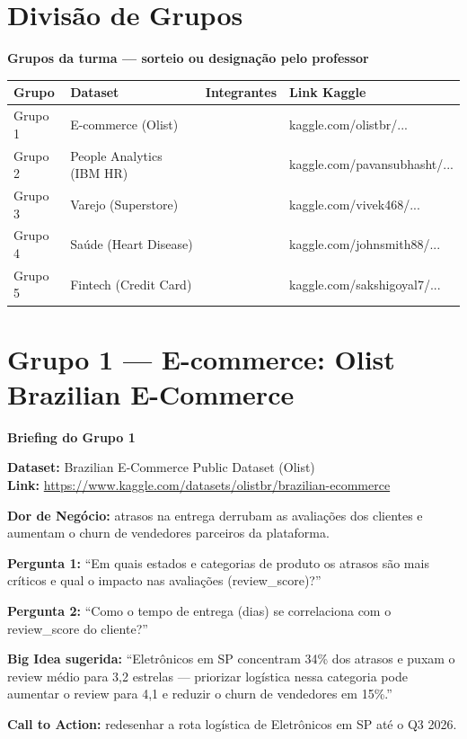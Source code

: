 \section{Divisão de Grupos}

\begin{BoardBox}
\textbf{Grupos da turma — sorteio ou designação pelo professor}

\begin{tabular}{|l|p{3.5cm}|p{3cm}|p{3cm}|}
\hline
\textbf{Grupo} & \textbf{Dataset} & \textbf{Integrantes} & \textbf{Link Kaggle} \\
\hline
Grupo 1 & E-commerce (Olist) & & kaggle.com/olistbr/... \\
Grupo 2 & People Analytics (IBM HR) & & kaggle.com/pavansubhasht/... \\
Grupo 3 & Varejo (Superstore) & & kaggle.com/vivek468/... \\
Grupo 4 & Saúde (Heart Disease) & & kaggle.com/johnsmith88/... \\
Grupo 5 & Fintech (Credit Card) & & kaggle.com/sakshigoyal7/... \\
\hline
\end{tabular}
\end{BoardBox}

\section{Grupo 1 — E-commerce: Olist Brazilian E-Commerce}

\begin{BoardBox}
\textbf{Briefing do Grupo 1}

\textbf{Dataset:} Brazilian E-Commerce Public Dataset (Olist)\\
\textbf{Link:} \url{https://www.kaggle.com/datasets/olistbr/brazilian-ecommerce}

\textbf{Dor de Negócio:} atrasos na entrega derrubam as avaliações dos clientes
e aumentam o churn de vendedores parceiros da plataforma.

\textbf{Pergunta 1:} ``Em quais estados e categorias de produto os atrasos são mais
críticos e qual o impacto nas avaliações (review\_score)?''

\textbf{Pergunta 2:} ``Como o tempo de entrega (dias) se correlaciona com o
review\_score do cliente?''

\textbf{Big Idea sugerida:} ``Eletrônicos em SP concentram 34\% dos atrasos e puxam
o review médio para 3,2 estrelas — priorizar logística nessa categoria pode aumentar
o review para 4,1 e reduzir o churn de vendedores em 15\%.''

\textbf{Call to Action:} redesenhar a rota logística de Eletrônicos em SP até o Q3 2026.
\end{BoardBox}


